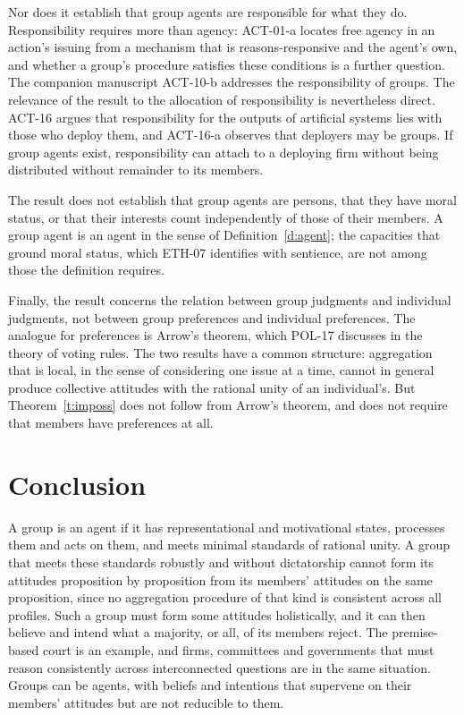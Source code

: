 \documentclass{situationist-preprint}
\begin{document}
Nor does it establish that group agents are responsible for what they do. Responsibility requires more than agency: ACT-01-a locates free agency in an action's issuing from a mechanism that is reasons-responsive and the agent's own, and whether a group's procedure satisfies these conditions is a further question. The companion manuscript ACT-10-b addresses the responsibility of groups. The relevance of the result to the allocation of responsibility is nevertheless direct. ACT-16 argues that responsibility for the outputs of artificial systems lies with those who deploy them, and ACT-16-a observes that deployers may be groups. If group agents exist, responsibility can attach to a deploying firm without being distributed without remainder to its members.

The result does not establish that group agents are persons, that they have moral status, or that their interests count independently of those of their members. A group agent is an agent in the sense of Definition~\ref{d:agent}; the capacities that ground moral status, which ETH-07 identifies with sentience, are not among those the definition requires.

Finally, the result concerns the relation between group judgments and individual judgments, not between group preferences and individual preferences. The analogue for preferences is Arrow's theorem, which POL-17 discusses in the theory of voting rules. The two results have a common structure: aggregation that is local, in the sense of considering one issue at a time, cannot in general produce collective attitudes with the rational unity of an individual's. But Theorem~\ref{t:imposs} does not follow from Arrow's theorem, and does not require that members have preferences at all.

\section{Conclusion}\label{s:conclusion}

A group is an agent if it has representational and motivational states, processes them and acts on them, and meets minimal standards of rational unity. A group that meets these standards robustly and without dictatorship cannot form its attitudes proposition by proposition from its members' attitudes on the same proposition, since no aggregation procedure of that kind is consistent across all profiles. Such a group must form some attitudes holistically, and it can then believe and intend what a majority, or all, of its members reject. The premise-based court is an example, and firms, committees and governments that must reason consistently across interconnected questions are in the same situation. Groups can be agents, with beliefs and intentions that supervene on their members' attitudes but are not reducible to them.
\end{document}
